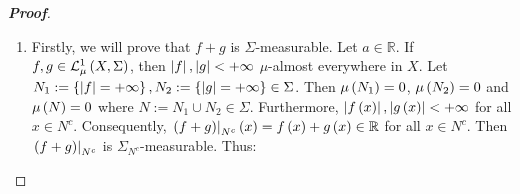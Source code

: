 \begin{proposition}
\begin{proof}[\rm\textbf{Proof}]
\begin{enumerate}
      Thus $\alpha\cdot f\in\Leb{X}{\Sigma}{\mu}$ and:

      \begin{equation}
        \begin{split}
          \int_{X}{\pr{\alpha\cdot f}\,d\mu} & =\int_{X}{\pr{\alpha\cdot f}^+\,d\mu}-\int_{X}{\pr{\alpha\cdot f}^-\,d\mu}=\int_{X}{\pr{\alpha\cdot f^+}\,d\mu}-\int_{X}{\pr{\alpha\cdot f^-}\,d\mu}\\
          & =\alpha\cdot\int_{X}{f^+\,d\mu}-\alpha\cdot\int_{X}{f^-\,d\mu}=\alpha\cdot\pr{\int_{X}{f^+\,d\mu}-\int_{X}{f^-\,d\mu}}\\
          & =\alpha\cdot\int_{X}{f\,d\mu}.
        \end{split}
      \end{equation}

      If $\alpha<0$, then $\pr{\alpha\cdot f}^{\pm}=-\alpha\cdot f^\mp$ and:
      
      \begin{equation}
        \int_{X}{\pr{\alpha\cdot f}^{\pm}\,d\mu}=\int_{X}{\pr{\pr{-\alpha}\cdot f^\mp}\,d\mu}=\pr{-\alpha}\cdot\int_{X}{f^\mp\,d\mu}<+\infty.
      \end{equation}

      Thus:

      \begin{equation}
        \begin{split}
          \int_{X}{\pr{\alpha\cdot f}\,d\mu} & =\int_{X}{\pr{\alpha\cdot f}^+\,d\mu}-\int_{X}{\pr{\alpha\cdot f}^-\,d\mu}\\
          & =\int_{X}{\pr{\pr{-\alpha}\cdot f^-}\,d\mu}-\int_{X}{\pr{\pr{-\alpha}\cdot f^+}\,d\mu}\\
          & =\pr{-\alpha}\cdot\int_{X}{f^-\,d\mu}-\pr{-\alpha}\cdot\int_{X}{f^+\,d\mu}\\
          & =\alpha\cdot\pr{\int_{X}{f^+\,d\mu}-\int_{X}{f^-\,d\mu}}=\alpha\cdot\int_{X}{f\,d\mu}.
        \end{split}
      \end{equation}

      In any case, $\alpha\cdot f\in\Leb{X}{\Sigma}{\mu}$ and:

      \begin{equation}
        \int_{X}{\alpha\cdot f\,d\mu}=\alpha\cdot\int_{X}{f\,d\mu}.
      \end{equation}
      \item Firstly, we will prove that $f+g$ is $\Sigma$-measurable. Let $a\in\mathbb{R}$. If $f,g\in\mathcal{L}^1_{\mu}\left(X,\Sigma\right)$, then $\left|f\right|,\left|g\right|<+\infty$ $\mu$-almost everywhere in $X$. Let $N_1:=\left\{\left|f\right|=+\infty\right\},N_2:=\left\{\left|g\right|=+\infty\right\}\in\Sigma$. Then $\mu\left(N_1\right)=0$, $\mu\left(N_2\right)=0$ and $\mu\left(N\right)=0$ where $N:=N_1\cup N_2\in\Sigma$. Furthermore, $\left|f\left(x\right)\right|,\left|g\left(x\right)\right|<+\infty$ for all $x\in N^c$. Consequently, $\left.\left(f+g\right)\right|_{N^c}\left(x\right)=f\left(x\right)+g\left(x\right)\in\mathbb{R}$ for all $x\in N^c$. Then $\left.\left(f+g\right)\right|_{N^c}$ is $\Sigma_{N^c}$-measurable. Thus:
      

\end{enumerate}
\end{proof}
\end{proposition}
